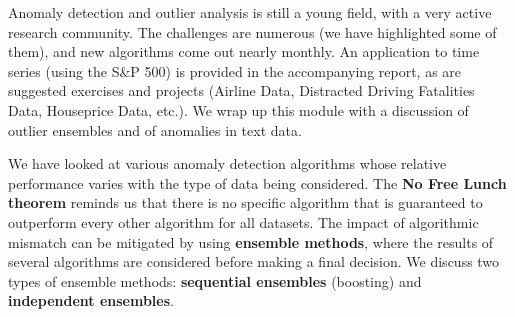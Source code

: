 \documentclass[20pt,landscape,footrule,headrule]{foils}
\newcommand{\newl}{\newline\newline}
\def\fh{\foilhead}
\begin{document}
{{%
















\fh{\textcolor{darkestgreen}{5.5 -- Advanced Topics}} \label{5.5}
\noindent Anomaly detection and outlier analysis is still a young field, with a very active research community. \newl The challenges are numerous (we have highlighted some of them), and new algorithms come out nearly monthly. \newl An application to time series (using the S\&P 500) is provided in the accompanying report, as are suggested exercises and projects (Airline Data, Distracted Driving Fatalities Data, Houseprice Data, etc.). \newl We wrap up this module with a discussion of outlier ensembles and of anomalies in text data. 


\fh{5.5.1 -- Outlier Ensembles} \label{5.5.1}
\noindent We have looked at various anomaly detection algorithms whose relative performance varies with the type of data being considered. 
\newl The  \textbf{No Free Lunch theorem} reminds us that there is no specific algorithm that is guaranteed to outperform every other algorithm for all datasets. \newl The impact of algorithmic mismatch can be mitigated by using \textbf{ensemble methods}, where the results of several algorithms are considered before making a final decision. \newl We discuss two types of ensemble methods:  \textbf{sequential ensembles} (boosting) and \textbf{independent ensembles}.

}}
\end{document}
